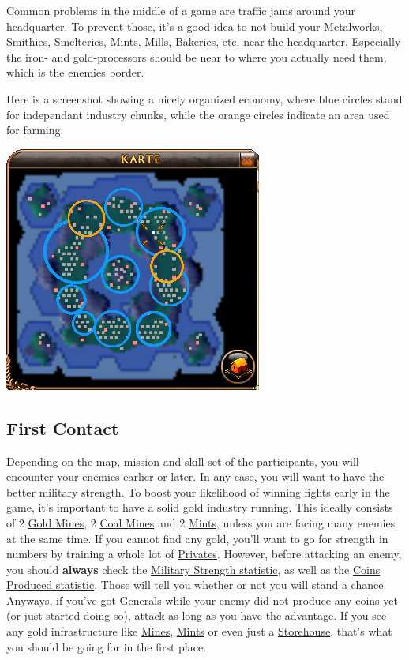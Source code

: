 \documentclass[12pt]{article}
\begin{document}
Common problems in the middle of a game are traffic jams around your headquarter. To prevent those, it's a good idea to not build your \hyperref[sec:metalworks]{Metalworks}, \hyperref[sec:smithy]{Smithies}, \hyperref[sec:smeltery]{Smelteries}, \hyperref[sec:mint]{Mints}, \hyperref[sec:mill]{Mills}, \hyperref[sec:bakery]{Bakeries}, etc. near the headquarter. Especially the iron- and gold-processors should be near to where you actually need them, which is the enemies border.

\vspace{12pt}
Here is a screenshot showing a nicely organized economy, where blue circles stand for independant industry chunks, while the orange circles indicate an area used for farming.

\vspace{1cm}
\includegraphics{decentralization_map_edited}
\vspace{1cm}

\subsection{First Contact}
\label{sec:firstcontact}

Depending on the map, mission and skill set of the participants, you will encounter your enemies earlier or later. In any case, you will want to have the better military strength. To boost your likelihood of winning fights  early in the game, it's important to have a solid gold industry running. This ideally consists of 2 \hyperref[sec:goldmine]{Gold Mines}, 2 \hyperref[sec:coalmine]{Coal Mines} and 2 \hyperref[sec:mint]{Mints}, unless you are facing many enemies at the same time. If you cannot find any gold, you'll want to go for strength in numbers by training a whole lot of \hyperref[sec:private]{Privates}. However, before attacking an enemy, you should \textbf{always} check the \hyperref[sec:statisticsmilitary]{Military Strength statistic}, as well as the \hyperref[sec:statisticscoins]{Coins Produced statistic}. Those will tell you whether or not you will stand a chance. Anyways, if you've got \hyperref[sec:general]{Generals} while your enemy did not produce any coins yet (or just started doing so), attack as long as you have the advantage. If you see any gold infrastructure like \hyperref[sec:goldmine]{Mines}, \hyperref[sec:mint]{Mints} or even just a \hyperref[sec:storehouse]{Storehouse}, that's what you should be going for in the first place.
\end{document}
